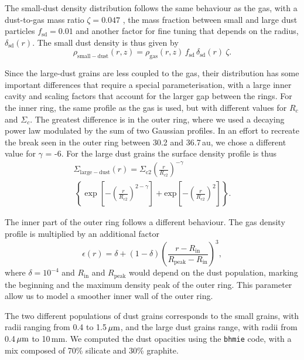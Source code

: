 \documentclass[letters,usenatbib,times]{mnras}
\begin{document}
The small-dust density distribution follows the same behaviour as the gas, with a dust-to-gas mass ratio $\zeta = 0.047$ \citep[as in][]{Rosenfeld_2013}, the mass fraction between small and large dust particles $f_\mathrm{sd}=0.01$ and another factor for fine tuning that depends on the radius,  $\delta_{\mathrm{sd}}(r)$. The small dust density is thus given by 
\begin{equation}
\rho_{\mathrm{small-dust}}(r,z)=\rho_{\mathrm{gas}}(r,z)\, f_{\mathrm{sd}} \, \delta_{\mathrm{sd}}(r) \: \zeta .
\end{equation}

Since the large-dust grains are less coupled to the gas, their distribution has some important differences that require a special parameterisation, with a large inner cavity and scaling factors that account for  the larger gap between the rings. For the inner ring, the same profile as the gas is used, but with different values for $R_c$ and $\Sigma_c$. The greatest difference is in the outer ring, where we used a decaying power law modulated by the sum of two    Gaussian profiles. In an effort to recreate the break seen in the outer ring between 30.2 and 36.7\,au, we chose a different value for $\gamma$ = -6. For the large dust grains the surface density profile is thus
\begin{multline}
  \Sigma_{\mathrm{large-dust}}(r) = \Sigma_{\mathrm{c}2} \left(\frac{r}{R_{\mathrm{c}2}}\right)^{-\gamma}  \\ \, \left\{ \exp\left[-\left(\frac{r}{R_{\mathrm{c}2}}\right)^{2-\gamma}\right] +  \mathrm{exp}\left[-\left(\frac{r}{R_{\mathrm{c}2}}\right)^{2}\right]\right\}.
\end{multline}

The inner part of the outer ring follows a different behaviour. The gas density profile is multiplied by an additional factor
\begin{equation}
    \epsilon(r) = \delta +  (1 - \delta) \left(\frac{ r - R_\mathrm{in}}{R_\mathrm{peak} - R_\mathrm{in}}\right)^3,
\end{equation}
where $\delta=10^{-4}$ and $R_\mathrm{in}$ and $R_\mathrm{peak}$ would depend on the dust population, marking the beginning and the maximum density peak of the outer ring. This parameter allow us to model a smoother inner wall of the outer ring.

The two different populations of dust grains corresponds to  the small grains, with  radii ranging  from 0.4 to 1.5\,$\hbox{$\mu$m}$, and the large dust grains range, with radii  from 0.4\,$\hbox{$\mu$m}$ to 10\,mm. We computed the dust opacities using the {\tt bhmie} code, with  a mix composed of  70\% silicate and 30\% graphite. 
\end{document}

